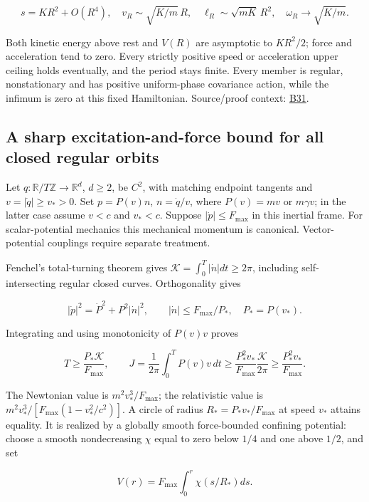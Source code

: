 \documentclass[11pt,a4paper]{article}
\begin{document}
\[s=KR^2+O(R^4),\quad v_R\sim\sqrt{K/m}\,R,\quad
\ell_R\sim\sqrt{mK}\,R^2,\quad \omega_R\to\sqrt{K/m}.\]

Both kinetic energy above rest and \(V(R)\) are asymptotic to
\(KR^2/2\); force and acceleration tend to zero. Every strictly positive
speed or acceleration upper ceiling holds eventually, and the period
stays finite. Every member is regular, nonstationary and has positive
uniform-phase covariance action, while the infimum is zero at this fixed
Hamiltonian. Source/proof context:
\href{../references/batches/B31.md}{B31}.

\hypertarget{a-sharp-excitation-and-force-bound-for-all-closed-regular-orbits}{%
\subsection{A sharp excitation-and-force bound for all closed regular
orbits}\label{a-sharp-excitation-and-force-bound-for-all-closed-regular-orbits}}

Let \(q:\mathbb R/T\mathbb Z\to\mathbb R^d\), \(d\ge2\), be \(C^2\),
with matching endpoint tangents and \(v=|\dot q|\ge v_*>0\). Set
\(p=P(v)n\), \(n=\dot q/v\), where \(P(v)=mv\) or \(m\gamma v\); in the
latter case assume \(v<c\) and \(v_*<c\). Suppose
\(|\dot p|\le F_{\max}\) in this inertial frame. For scalar-potential
mechanics this mechanical momentum is canonical. Vector-potential
couplings require separate treatment.

Fenchel's total-turning theorem gives
\(\mathcal K=\int_0^T|\dot n|dt\ge2\pi\), including self-intersecting
regular closed curves. Orthogonality gives

\[|\dot p|^2=\dot P^2+P^2|\dot n|^2,\qquad
|\dot n|\le F_{\max}/P_*,\quad P_*=P(v_*).\]

Integrating and using monotonicity of \(P(v)v\) proves

\[T\ge\frac{P_*\mathcal K}{F_{\max}},\qquad
J=\frac1{2\pi}\int_0^T P(v)v\,dt
 \ge\frac{P_*^2v_*}{F_{\max}}\frac{\mathcal K}{2\pi}
 \ge\frac{P_*^2v_*}{F_{\max}}.\]

The Newtonian value is \(m^2v_*^3/F_{\max}\); the relativistic value is
\(m^2v_*^3/[F_{\max}(1-v_*^2/c^2)]\). A circle of radius
\(R_*=P_*v_*/F_{\max}\) at speed \(v_*\) attains equality. It is
realized by a globally smooth force-bounded confining potential: choose
a smooth nondecreasing \(\chi\) equal to zero below \(1/4\) and one
above \(1/2\), and set

\[V(r)=F_{\max}\int_0^r\chi(s/R_*)ds.\]
\end{document}
